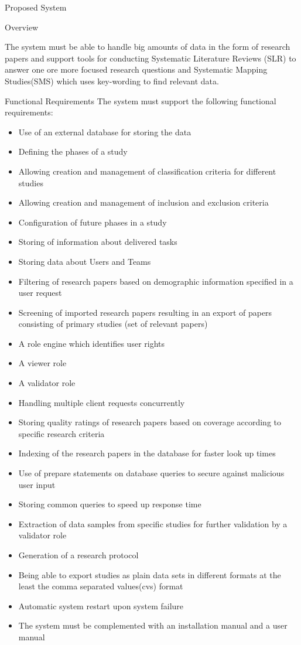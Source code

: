 \begin{section}{Proposed System}
\begin{subsection}{Overview}

The system must be able to handle big amounts of data in the form of research papers and support tools for conducting Systematic Literature Reviews (SLR) to answer one ore more focused research questions and Systematic Mapping Studies(SMS) which uses key-wording to find relevant data.

\end{subsection}

\begin{subsection}{Functional Requirements}
The system must support the following functional requirements:

\begin{itemize}
\item Use of an external database for storing the data
\item Defining the phases of a study
\item Allowing creation and management of classification criteria for different studies
\item Allowing creation and management of inclusion and exclusion criteria
\item Configuration of future phases in a study
\item Storing of information about delivered tasks
\item Storing data about Users and Teams
\item Filtering of research papers based on demographic information specified in a user request
\item Screening of imported research papers resulting in an export of papers consisting of primary studies (set of relevant papers)
\item A role engine which identifies user rights
\item A viewer role
\item A validator role
\item Handling multiple client requests concurrently
\item Storing quality ratings of research papers based on coverage according to specific research criteria
\item Indexing of the research papers in the database for faster look up times
\item Use of prepare statements on database queries to secure against malicious user input
\item Storing common queries to speed up response time
\item Extraction of data samples from specific studies for further validation by a validator role
\item Generation of a research protocol
\item Being able to export studies as plain data sets in different formats at the least the comma separated values(cvs) format
\item Automatic system restart upon system failure
\item The system must be complemented with an installation manual and a user manual


\end{itemize}
\end{subsection}
\end{section}
